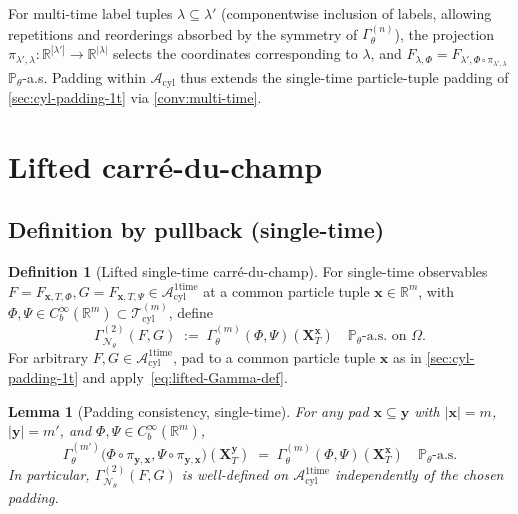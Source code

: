 \documentclass[11pt,reqno]{amsart}
\theoremstyle{plain}
\newtheorem{lemma}[theorem]{Lemma}
\theoremstyle{definition}
\newtheorem{definition}[theorem]{Definition}
\theoremstyle{remark}
\newcommand{\R}{\mathbb R}
\newcommand{\Prob}{\mathbb P}
\newcommand{\cA}{\mathcal A}
\newcommand{\cN}{\mathcal N}
\newcommand{\cT}{\mathcal T}
\newcommand{\Acyl}{\cA_{\mathrm{cyl}}}
\newcommand{\Aone}{\cA_{\mathrm{cyl}}^{\mathrm{1time}}}
\newcommand{\Tcyl}{\cT_{\mathrm{cyl}}}
\newcommand{\GamN}{\Gamma^{(2)}_{\cN_{\theta}}}
\newcommand{\GamM}[1]{\Gamma^{(#1)}_{\theta}}
\newcommand{\Pth}{\Prob_{\theta}}
\begin{document}
For multi-time label tuples $\lambda\subseteq\lambda'$
(componentwise inclusion of labels, allowing repetitions and
reorderings absorbed by the symmetry of $\GamM{n}$), the projection
$\pi_{\lambda',\lambda}\colon\R^{|\lambda'|}\to\R^{|\lambda|}$
selects the coordinates corresponding to $\lambda$, and
$F_{\lambda,\Phi}=F_{\lambda',\Phi\circ\pi_{\lambda',\lambda}}$
$\Pth$-a.s. Padding within $\Acyl$ thus extends the single-time
particle-tuple padding of \cref{sec:cyl-padding-1t} via
\cref{conv:multi-time}.

\section{Lifted carr\'e-du-champ}\label{sec:lifted-Gamma}

\subsection{Definition by pullback (single-time)}\label{sec:lifted-def}

\begin{definition}[Lifted single-time carr\'e-du-champ]\label{def:lifted-Gamma}
For single-time observables
$F=F_{\mathbf x,T,\Phi},G=F_{\mathbf x,T,\Psi}\in\Aone$ at a common
particle tuple $\mathbf x\in\R^{m}$, with
$\Phi,\Psi\in C_{b}^{\infty}(\R^{m})\subset\Tcyl^{(m)}$, define
\begin{equation}\label{eq:lifted-Gamma-def}
  \GamN(F,G)\;:=\;\GamM{m}(\Phi,\Psi)(\mathbf X_{T}^{\mathbf x})
  \quad\Pth\text{-a.s.\ on }\Omega.
\end{equation}
For arbitrary $F,G\in\Aone$, pad to a common particle tuple
$\mathbf x$ as in \cref{sec:cyl-padding-1t} and
apply~\eqref{eq:lifted-Gamma-def}.
\end{definition}

\begin{lemma}[Padding consistency, single-time]\label{lem:padding}
For any pad $\mathbf x\subseteq\mathbf y$ with $|\mathbf x|=m$,
$|\mathbf y|=m'$, and $\Phi,\Psi\in C_{b}^{\infty}(\R^{m})$,
\begin{equation}\label{eq:padding-consistency}
  \GamM{m'}\bigl(\Phi\circ\pi_{\mathbf y,\mathbf x},\Psi\circ\pi_{\mathbf y,\mathbf x}\bigr)(\mathbf X_{T}^{\mathbf y})
  \;=\;\GamM{m}(\Phi,\Psi)(\mathbf X_{T}^{\mathbf x})
  \quad\Pth\text{-a.s.}
\end{equation}
In particular, $\GamN(F,G)$ is well-defined on $\Aone$
independently of the chosen padding.
\end{lemma}
\end{document}
